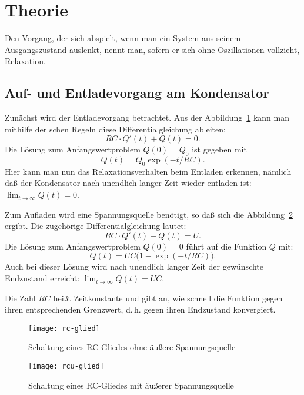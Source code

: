 
\section{Theorie}

Den Vorgang, der sich abspielt, wenn man ein System aus seinem
Ausgangszustand auslenkt, nennt man, sofern er sich ohne Oszillationen
vollzieht, Relaxation.

\subsection{Auf- und Entladevorgang am Kondensator}
Zunächst wird der Entladevorgang betrachtet. Aus der
Abbildung~\ref{fig:rc-glied} kann man mithilfe der schen
Regeln diese Differentialgleichung ableiten:
%
\begin{equation}
  \label{eq:rc-dgl}
  RC\cdot Q'(t) + Q(t) = 0 \text{.}
\end{equation}
%
Die Lösung zum Anfangswertproblem $Q(0) = Q_0$ ist gegeben mit
%
\begin{equation}
  \label{eq:sol-rc-dgl}
  Q(t) = Q_0 \exp(-t/RC) \text{.}
\end{equation}
%
Hier kann man nun das Relaxationsverhalten beim Entladen erkennen,
nämlich daß der Kondensator nach unendlich langer Zeit wieder entladen
ist: $\lim_{t\to\infty} Q(t) = 0$.

Zum Aufladen wird eine Spannungsquelle benötigt, so daß sich die
Abbildung~\ref{fig:rcu-glied} ergibt. Die zugehörige
Differentialgleichung lautet:
%
\begin{equation}
  \label{eq:rcu-dgl}
  RC\cdot Q'(t) + Q(t) = U \text{.}
\end{equation}
%
Die Lösung zum Anfangswertproblem $Q(0) = 0$ führt auf die Funktion $Q$
mit:
%
\begin{equation}
  \label{eq:sol-rcu-dgl}
  Q(t) = UC \Big(1-\exp(-t/RC)\Big) \text{.}
\end{equation}
%
Auch bei dieser Lösung wird nach unendlich langer Zeit der gewünschte
Endzustand erreicht: $\lim_{t\to\infty} Q(t) = UC$. 

Die Zahl $RC$ heißt Zeitkonstante und gibt an, wie schnell die Funktion
gegen ihren entsprechenden Grenzwert, d.\,h. gegen ihren Endzustand
konvergiert.

\begin{figure}
  \centering
  \texttt{[image: rc-glied]}
  \caption{Schaltung eines RC-Gliedes ohne äußere Spannungsquelle}
  \label{fig:rc-glied}
\end{figure}

\begin{figure}
  \centering
  \texttt{[image: rcu-glied]}
  \caption{Schaltung eines RC-Gliedes mit äußerer Spannungsquelle}
  \label{fig:rcu-glied}
\end{figure}